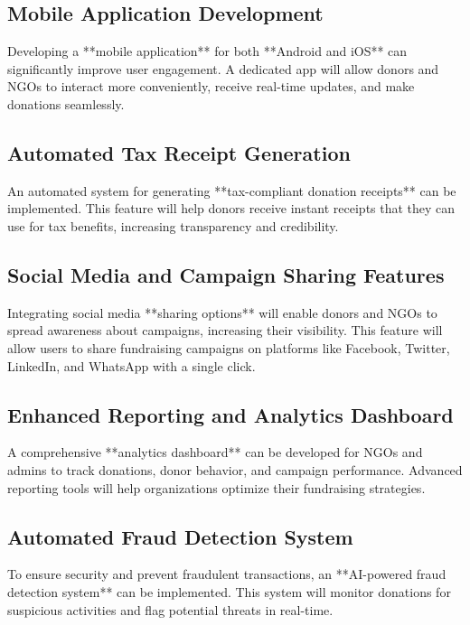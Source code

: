 \subsection{Mobile Application Development}
Developing a **mobile application** for both **Android and iOS** can significantly improve user engagement. A dedicated app will allow donors and NGOs to interact more conveniently, receive real-time updates, and make donations seamlessly.

\subsection{Automated Tax Receipt Generation}
An automated system for generating **tax-compliant donation receipts** can be implemented. This feature will help donors receive instant receipts that they can use for tax benefits, increasing transparency and credibility.

\subsection{Social Media and Campaign Sharing Features}
Integrating social media **sharing options** will enable donors and NGOs to spread awareness about campaigns, increasing their visibility. This feature will allow users to share fundraising campaigns on platforms like Facebook, Twitter, LinkedIn, and WhatsApp with a single click.

\subsection{Enhanced Reporting and Analytics Dashboard}
A comprehensive **analytics dashboard** can be developed for NGOs and admins to track donations, donor behavior, and campaign performance. Advanced reporting tools will help organizations optimize their fundraising strategies.

\subsection{Automated Fraud Detection System}
To ensure security and prevent fraudulent transactions, an **AI-powered fraud detection system** can be implemented. This system will monitor donations for suspicious activities and flag potential threats in real-time.

